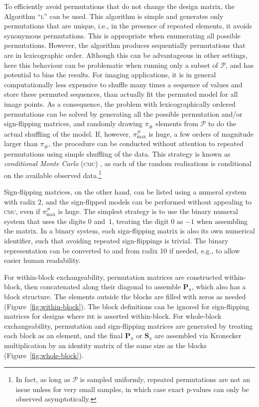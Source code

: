 To efficiently avoid permutations that do not change the design matrix, the Algorithm ``\textsc{l}'' \citep{Knuth2005} can be used. This algorithm is simple and generates only permutations that are unique, i.e., in the presence of repeated elements, it avoids synonymous permutations. This is appropriate when enumerating all possible permutations. However, the algorithm produces sequentially permutations that are in lexicographic order. Although this can be advantageous in other settings, here this behaviour can be problematic when running only a subset of $\mathcal{P}$, and has potential to bias the results. For imaging applications, it is in general computationally less expensive to shuffle many times a sequence of values and store these permuted sequences, than actually fit the permuted model for all image points. As a consequence, the problem with lexicographically ordered permutations can be solved by generating all the possible permutation and/or sign-flipping matrices, and randomly drawing $\pi_{\text{\#}}$ elements from $\mathcal{P}$ to do the actual shuffling of the model. If, however, $\pi^{\mathcal{P}}_{\text{max}}$ is huge, a few orders of magnitude larger than $\pi_{\text{\#}}$, the procedure can be conducted without attention to repeated permutations using simple shuffling of the data. This strategy is known as \emph{conditional Monte Carlo} (\textsc{cmc}) \citep{Trotter1956, Pesarin2010}, as each of the random realisations is conditional on the available observed data.\footnote{In fact, as long as $\mathcal{P}$ is sampled uniformly, repeated permutations are not an issue unless for very small samples, in which case exact p-values can only be observed asymptotically.}

Sign-flipping matrices, on the other hand, can be listed using a numeral system with radix 2, and the sign-flipped models can be performed without appealing to \textsc{cmc}, even if $\pi^{\mathcal{P}}_{\text{max}}$ is huge. The simplest strategy is to use the binary numeral system that uses the digits $0$ and~$1$, treating the digit 0 as $-1$ when assembling the matrix. In a binary system, each sign-flipping matrix is also its own numerical identifier, such that avoiding repeated sign-flippings is trivial. The binary representation can be converted to and from radix 10 if needed, e.g., to allow easier human readability.

For within-block exchangeability, permutation matrices are constructed within-block, then concatenated along their diagonal to assemble $\mathbf{P}_{\pi}$, which also has a block structure. The elements outside the blocks are filled with zeros as needed  (Figure~\ref{fig:within-block}). The block definitions can be ignored for sign-flipping matrices for designs where \textsc{ise} is asserted within-block. For whole-block exchangeability, permutation and sign-flipping matrices are generated by treating each block as an element, and the final $\mathbf{P}_{\pi}$ or $\mathbf{S}_{\pi}$ are assembled via Kronecker multiplication by an identity matrix of the same size as the blocks (Figure~\ref{fig:whole-block}).

